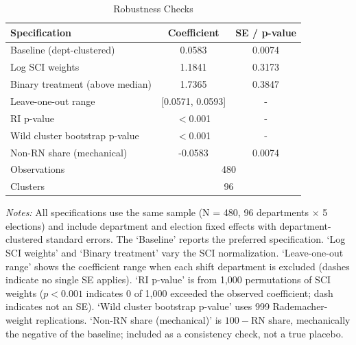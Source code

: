 \begin{table}[htbp]
\centering
\caption{Robustness Checks}
\label{tab:robustness}
\begin{tabular}{lcc}
\toprule
Specification & Coefficient & SE / p-value \\
\midrule
Baseline (dept-clustered) & 0.0583 & 0.0074 \\
Log SCI weights & 1.1841 & 0.3173 \\
Binary treatment (above median) & 1.7365 & 0.3847 \\
Leave-one-out range & [0.0571, 0.0593] & - \\
RI p-value & $<$0.001 & - \\
Wild cluster bootstrap p-value & $<$0.001 & - \\
Non-RN share (mechanical) & -0.0583 & 0.0074 \\
\midrule
Observations & \multicolumn{2}{c}{480} \\
Clusters & \multicolumn{2}{c}{96} \\
\bottomrule
\end{tabular}
\begin{minipage}{0.95\textwidth}
\small\textit{Notes:} All specifications use the same sample (N = 480, 96 departments $\times$ 5 elections) and include department and election fixed effects with department-clustered standard errors. The `Baseline' reports the preferred specification. `Log SCI weights' and `Binary treatment' vary the SCI normalization. `Leave-one-out range' shows the coefficient range when each shift department is excluded (dashes indicate no single SE applies). `RI p-value' is from 1,000 permutations of SCI weights ($p < 0.001$ indicates 0 of 1,000 exceeded the observed coefficient; dash indicates not an SE). `Wild cluster bootstrap p-value' uses 999 Rademacher-weight replications. `Non-RN share (mechanical)' is $100 - \text{RN share}$, mechanically the negative of the baseline; included as a consistency check, not a true placebo.
\end{minipage}
\end{table}
